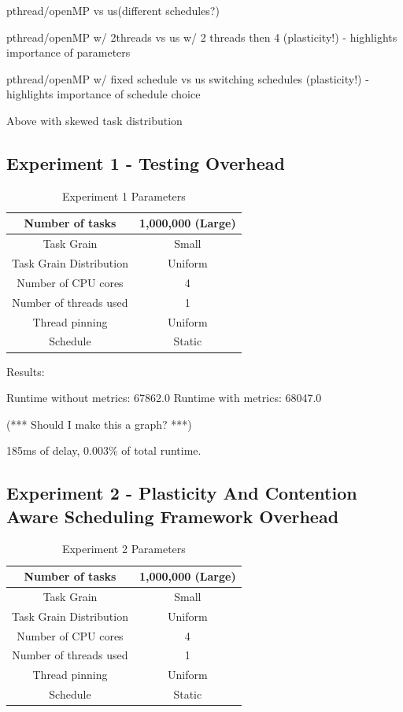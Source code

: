 pthread/openMP vs us(different schedules?)

pthread/openMP w/ 2threads vs us w/ 2 threads then 4 (plasticity!)       - highlights importance of parameters

pthread/openMP w/ fixed schedule vs us switching schedules (plasticity!) - highlights importance of schedule choice

 Above with skewed task distribution

\subsection{Experiment 1 - Testing Overhead}

\begin{table}
\centering
	\begin{tabular}{|c|c|}
		\hline
		Number of tasks & 1,000,000 (Large) \\
		\hline
		Task Grain & Small \\
		\hline
		Task Grain Distribution & Uniform \\
		\hline
		Number of CPU cores & 4 \\
		\hline
		Number of threads used & 1 \\
		\hline
		Thread pinning & Uniform \\
		\hline
		Schedule & Static \\
		\hline
	\end{tabular}
\caption{Experiment 1 Parameters}
\label{table:ex1_parameters}
\end{table}

Results: 

Runtime without metrics: 67862.0
Runtime with metrics:    68047.0

(*** Should I make this a graph? ***)

185ms of delay, 0.003\% of total runtime.






\subsection{Experiment 2 - Plasticity And Contention Aware Scheduling Framework Overhead}

\begin{table}
\centering
	\begin{tabular}{|c|c|}
		\hline
		Number of tasks & 1,000,000 (Large) \\
		\hline
		Task Grain & Small \\
		\hline
		Task Grain Distribution & Uniform \\
		\hline
		Number of CPU cores & 4 \\
		\hline
		Number of threads used & 1 \\
		\hline
		Thread pinning & Uniform \\
		\hline
		Schedule & Static \\
		\hline
	\end{tabular}
\caption{Experiment 2 Parameters}
\label{table:ex2_parameters}
\end{table}

